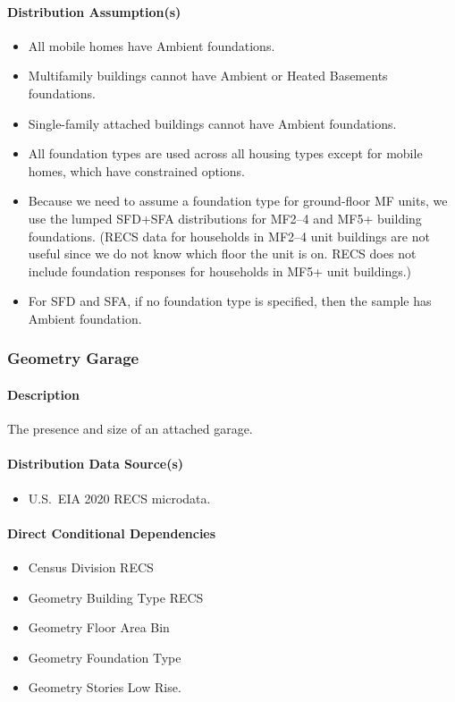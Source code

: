\paragraph{Distribution Assumption(s)}
\begin{itemize}
    \item All mobile homes have Ambient foundations.
    \item Multifamily buildings cannot have Ambient or Heated Basements foundations.
    \item Single-family attached buildings cannot have Ambient foundations.
    \item All foundation types are used across all housing types  except for mobile homes, which have constrained options.
    \item Because we need to assume a foundation type for ground-floor MF units, we use the lumped SFD+SFA distributions for MF2--4 and MF5+ building foundations. (RECS data for households in MF2--4 unit buildings are not useful since we do not know which floor the unit is on. RECS does not include foundation responses for households in MF5+ unit buildings.)
    \item For SFD and SFA, if no foundation type is specified, then the sample has Ambient foundation.
\end{itemize}

\subsubsection{Geometry Garage}
\paragraph{Description}
The presence and size of an attached garage.

\paragraph{Distribution Data Source(s)}
\begin{itemize}
    \item U.S.~EIA 2020 RECS microdata.
\end{itemize}

\paragraph{Direct Conditional Dependencies}
\begin{itemize}
    \item Census Division RECS
    \item Geometry Building Type RECS
    \item Geometry Floor Area Bin
    \item Geometry Foundation Type
    \item Geometry Stories Low Rise.
\end{itemize}

